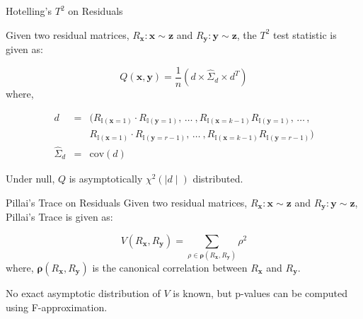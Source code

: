 \documentclass{beamer}
\begin{document}
\begin{frame}{Hotelling's $ T^2 $ on Residuals}

Given two residual matrices, $ R_{\mathbf{x}}: \mathbf{x} \sim \mathbf{z} $ and $ R_{\mathbf{y}}: \mathbf{y} \sim \mathbf{z} $, the $ T^2 $ test statistic is given as:

\begin{equation}
	Q(\mathbf{x}, \mathbf{y}) = \frac{1}{n} \left( d \times \hat{\Sigma}_d \times d^T \right)
\end{equation}
where,

\begin{eqnarray*}
d &  =  & (R_{\mathbb{I}(\mathbf{x}=1)} \cdot R_{\mathbb{I}(\mathbf{y}=1)}, \, \ldots \ ,
R_{\mathbb{I}(\mathbf{x}=k-1)} R_{\mathbb{I}(\mathbf{y}=1)}, \, \ldots \, ,
\\
 &  & R_{\mathbb{I}(\mathbf{x}=1)} \cdot R_{\mathbb{I}(\mathbf{y}=r-1)}, \, \ldots \ ,
R_{\mathbb{I}(\mathbf{x}=k-1)} R_{\mathbb{I}(\mathbf{y}=r-1)}
) \\
\hat{\Sigma}_d & = &\textrm{cov}(d)
\end{eqnarray*}



Under null, $ Q $ is asymptotically $ \chi^2 (\mid d \mid) $ distributed.

\end{frame}

\begin{frame}{Pillai's Trace on Residuals}
Given two residual matrices, $ R_{\mathbf{x}}: \mathbf{x} \sim \mathbf{z} $ and $ R_{\mathbf{y}}: \mathbf{y} \sim \mathbf{z} $, Pillai's Trace is given as:

\begin{equation}
	\textit{V}(R_\mathbf{x}, R_\mathbf{y}) = \sum_{\rho \in \bm{\rho}(R_\mathbf{x}, R_\mathbf{y})} \rho^2
\end{equation}
where, $ \bm{\rho}({R_\mathbf{x}, R_\mathbf{y}}) $  is the canonical correlation between $ R_\mathbf{x} $ and $ R_\mathbf{y} $.

\vspace{1em}

No exact asymptotic distribution of $ V $ is known, but p-values can be computed using F-approximation.
\end{frame}
\end{document}

